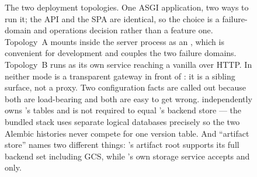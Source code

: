 \begin{figure}[tbp]
\begin{cbscaled}[0.92]
\begin{tikzpicture}[x=1cm,y=1cm]
\end{tikzpicture}
\end{cbscaled}
\fi
\caption{The two deployment topologies. One ASGI application, two ways to run it;
the API and the SPA are identical, so the choice is a failure-domain and
operations decision rather than a feature one. Topology~A mounts \sys inside the
\mlflow{} server process as an , which is convenient for
development and couples the two failure domains. Topology~B runs \sys as its own
service reaching a vanilla \mlflow{} over HTTP. In neither mode is \sys a
transparent gateway in front of \mlflow{}: it is a sibling surface, not a proxy.
Two configuration facts are called out because both are load-bearing and both are
easy to get wrong.  independently owns \sys's tables
and is not required to equal \mlflow{}'s backend store --- the bundled stack uses
separate logical databases precisely so the two Alembic histories never compete
for one version table. And ``artifact store'' names two different things:
\mlflow{}'s artifact root supports its full backend set including GCS, while
\sys's own storage service accepts  and  only.}
\label{fig:topologies}
\end{figure}
